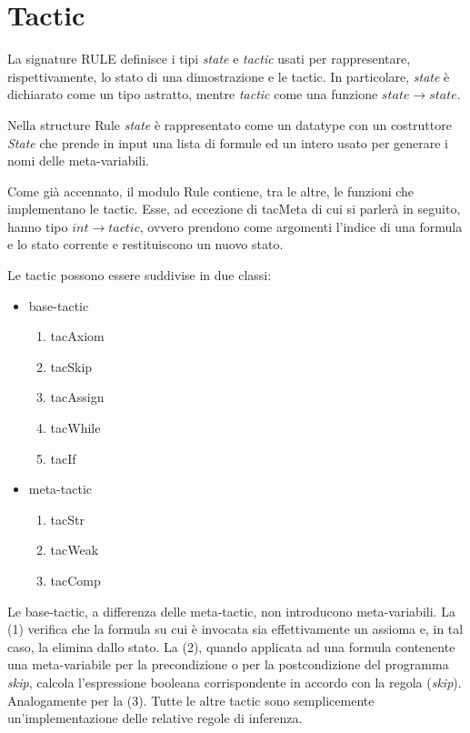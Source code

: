 \documentclass[]{article}
\begin{document}
\section{Tactic}
La signature RULE definisce i tipi \emph{state} e \emph{tactic} usati per rappresentare, rispettivamente, lo stato di una dimostrazione e le tactic. In particolare, \emph{state} \`e dichiarato come un tipo astratto, mentre \emph{tactic} come una funzione $state \rightarrow state$.
\par
Nella structure Rule \emph{state} \`e rappresentato come un datatype con un costruttore \emph{State} che prende in input una lista di formule ed un intero usato per generare i nomi delle meta-variabili.
\par
Come gi\`a accennato, il modulo Rule contiene, tra le altre, le funzioni che implementano le tactic. Esse, ad eccezione di tacMeta di cui si parler\`a in seguito, hanno tipo $int \rightarrow tactic$, ovvero prendono come argomenti l'indice di una formula e lo stato corrente e restituiscono un nuovo stato.
\par
Le tactic possono essere suddivise in due classi:
\begin{itemize}
	\item base-tactic
	\begin{enumerate}
		\item tacAxiom
		\item tacSkip 
		\item tacAssign
		\item tacWhile
		\item tacIf
		\setcounter{enumTemp}{\theenumi}
	\end{enumerate}
	\item meta-tactic
	\begin{enumerate}
		\setcounter{enumi}{\theenumTemp}
		\item tacStr
		\item tacWeak 
		\item tacComp
		\setcounter{enumTemp}{\theenumi}
	\end{enumerate}
\end{itemize}
\par
Le base-tactic, a differenza delle meta-tactic, non introducono meta-variabili. La (1) verifica che la formula su cui \`e invocata sia effettivamente un assioma e, in tal caso, la elimina dallo stato. La (2), quando applicata ad una formula contenente una meta-variabile per la precondizione o per la postcondizione del programma \emph{skip}, calcola l'espressione booleana corrispondente in accordo con la regola (\emph{skip}). Analogamente per la (3). Tutte le altre tactic sono semplicemente un'implementazione delle relative regole di inferenza.
\end{document}
